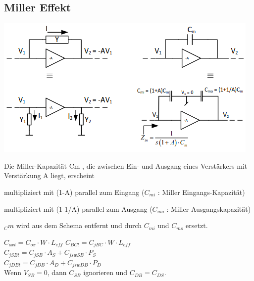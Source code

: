 \subsection{Miller Effekt}
\begin{minipage}[c]{0.5\textwidth}
	\includegraphics[width=1\linewidth]{chapters/Frequenzverhalten/images/miller}
\end{minipage}
\begin{minipage}[c]{0.5\textwidth}
	Die Miller-Kapazität Cm , die zwischen Ein- und Ausgang eines Verstärkers mit Verstärkung A liegt, erscheint
	\begin{compactitem}
		\item multipliziert mit (1-A) parallel zum Eingang ($C_{mi}$ : Miller Eingangs-Kapazität)
		\item multipliziert mit (1-1/A) parallel zum Ausgang ($C_{mo}$ : Miller Ausgangskapazität)
		\item $_Cm$ wird aus dem Schema entfernt und durch $C_{mi}$ und $C_{mo}$ ersetzt.
	\end{compactitem}
\end{minipage}
$C_{oxt}=C_{ox}\cdot W \cdot L_{eff}$ \hspace{0.5mm} $C_{BCt}=C_{jBC}\cdot W \cdot L_{eff}$\\
$C_{jSBt} = C_{jSB} \cdot A_S + C_{jswSB} \cdot P_S$\\
$C_{jDBt} = C_{jDB}\cdot A_D + C_{jswDB}\cdot P_D$\\

Wenn $V_{SB}=0$, dann $C_{SB}$ ignorieren und $C_{DB}=C_{DS}$.